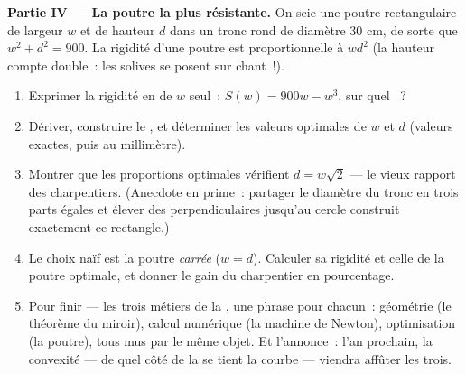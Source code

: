 \begin{problem}
\medskip
\noindent\textbf{Partie IV --- La poutre la plus résistante.}
On scie une poutre rectangulaire de largeur $w$ et de hauteur $d$
dans un tronc rond de diamètre $30$ cm, de sorte que
$w^2 + d^2 = 900$. La rigidité d'une poutre est proportionnelle à
$w d^2$ (la hauteur compte double~: les solives se posent sur
chant~!).
\begin{enumerate}[resume]
  \item Exprimer la rigidité en  de $w$ seul~:
        $S(w) = 900w - w^3$, sur quel ~?
  \item Dériver, construire le , et déterminer
        les valeurs optimales de $w$ et $d$ (valeurs exactes, puis
        au millimètre).
  \item Montrer que les proportions optimales vérifient
        $d = w\sqrt2$ --- le vieux rapport des charpentiers.
        (Anecdote en prime~: partager le diamètre du tronc en trois
        parts égales et élever des perpendiculaires jusqu'au cercle
        construit exactement ce rectangle.)
  \item Le choix naïf est la poutre \emph{carrée} ($w = d$).
        Calculer sa rigidité et celle de la poutre optimale, et
        donner le gain du charpentier en pourcentage.
  \item Pour finir --- les trois métiers de la , une phrase
        pour chacun~: géométrie (le théorème du miroir), calcul
        numérique (la machine de Newton), optimisation (la poutre),
        tous mus par le même objet. Et l'annonce~: l'an prochain, la
        convexité --- de quel côté de la  se tient la courbe
        --- viendra affûter les trois.
\end{enumerate}
\end{problem}
